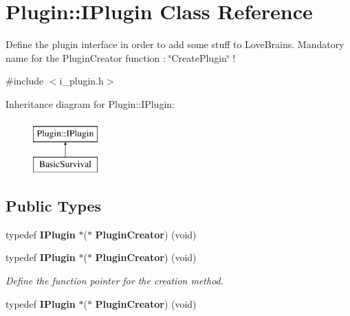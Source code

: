 \section{Plugin\+:\+:I\+Plugin Class Reference}
\label{class_plugin_1_1_i_plugin}


Define the plugin interface in order to add some stuff to Love\+Brains. Mandatory name for the Plugin\+Creator function \+: \char`\"{}\+Create\+Plugin\char`\"{} !  




{\ttfamily \#include $<$i\+\_\+plugin.\+h$>$}

Inheritance diagram for Plugin\+:\+:I\+Plugin\+:\begin{figure}[H]
\begin{center}
\leavevmode
\includegraphics[height=2.000000cm]{class_plugin_1_1_i_plugin}
\end{center}
\end{figure}
\subsection*{Public Types}
\begin{DoxyCompactItemize}
\item 
typedef {\bf I\+Plugin} $\ast$($\ast$ {\bfseries Plugin\+Creator}) (void)\label{class_plugin_1_1_i_plugin_acabdfce5c711ade0685f6d92b3200fd9}

\item 
typedef {\bf I\+Plugin} $\ast$($\ast$ {\bf Plugin\+Creator}) (void)\label{class_plugin_1_1_i_plugin_acabdfce5c711ade0685f6d92b3200fd9}

\begin{DoxyCompactList}\small\item\em Define the function pointer for the creation method. \end{DoxyCompactList}\item 
typedef {\bf I\+Plugin} $\ast$($\ast$ {\bfseries Plugin\+Creator}) (void)\label{class_plugin_1_1_i_plugin_acabdfce5c711ade0685f6d92b3200fd9}

\end{DoxyCompactItemize}
